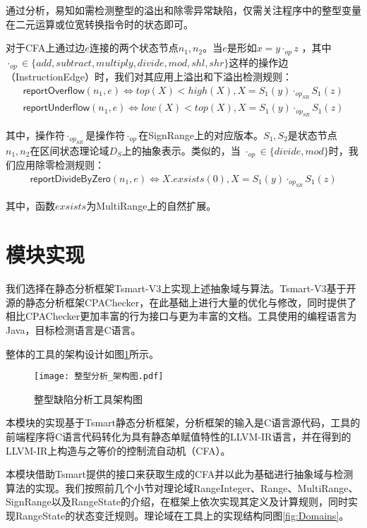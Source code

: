 通过分析，易知如需检测整型的溢出和除零异常缺陷，仅需关注程序中的整型变量在二元运算或位宽转换指令时的状态即可。

对于CFA上通过边$ e $连接的两个状态节点$ n_1, n_2 $。当$ e $是形如$ x = y \cdot_{op} z $ ，其中 $\cdot_{op} \in \{ add, subtract, multiply, divide, mod, shl, shr \} $这样的操作边（InstructionEdge）时，我们对其应用上溢出和下溢出检测规则：
\begin{align}
	\label{align:overflow}\mathsf{reportOverflow}(n_1, e) \iff top(X) < high(X), X = S_1(y) \cdot_{op_{SR}} S_1(z)\\
	\label{align:underflow}\mathsf{reportUnderflow}(n_1, e) \iff low(X) < top(X), X = S_1(y) \cdot_{op_{SR}} S_1(z)
\end{align}

其中，操作符$ \cdot_{op_{SR}} $是操作符$ \cdot_{op} $在SignRange上的对应版本。$ S_1, S_2 $是状态节点$ n_1, n_2 $在区间状态理论域$ D_S $上的抽象表示。类似的，当 $\cdot_{op} \in \{ divide, mod \} $时，我们应用除零检测规则：
\begin{align}
	\label{align:dividebyzero}\mathsf{reportDivideByZero}(n_1, e) \iff X.exsists(0), X = S_1(y) \cdot_{op_{SR}} S_1(z)
\end{align}

其中，函数$ exsists $为MultiRange上的自然扩展。

\section{模块实现} 

我们选择在静态分析框架Tsmart-V3上实现上述抽象域与算法。Tsmart-V3基于开源的静态分析框架CPAChecker，在此基础上进行大量的优化与修改，同时提供了相比CPAChecker更加丰富的行为接口与更为丰富的文档。工具使用的编程语言为Java，目标检测语言是C语言。

整体的工具的架构设计如图\ref{fig:整型分析架构图}所示。

\begin{figure}[H]
	\centering
	\texttt{[image: 整型分析\_架构图.pdf]}
	\caption{整型缺陷分析工具架构图}
	\label{fig:整型分析架构图}
\end{figure}

本模块的实现基于Tsmart静态分析框架，分析框架的输入是C语言源代码，工具的前端程序将C语言代码转化为具有静态单赋值特性的LLVM-IR语言，并在得到的LLVM-IR上构造与之等价的控制流自动机（CFA）。

本模块借助Tsmart提供的接口来获取生成的CFA并以此为基础进行抽象域与检测算法的实现。我们按照前几个小节对理论域RangeInteger、Range、MultiRange、SignRange以及RangeState的介绍，在框架上依次实现其定义及计算规则，同时实现RangeState的状态变迁规则。理论域在工具上的实现结构同图\ref{fig:Domains}。

